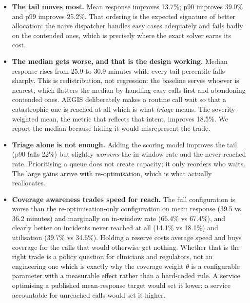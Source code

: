 \begin{itemize}
\item \textbf{The tail moves most.} Mean response improves 13.7\%; p90 improves
      39.0\% and p99 improves 25.2\%. That ordering is the expected signature
      of better allocation: the naive dispatcher handles easy cases adequately
      and fails badly on the contended ones, which is precisely where the exact
      solver earns its cost.

\item \textbf{The median gets worse, and that is the design working.} Median
      response rises from 25.9 to 30.9 minutes while every tail percentile
      falls sharply. This is redistribution, not regression: the baseline
      serves whoever is nearest, which flatters the median by handling easy
      calls first and abandoning contended ones. AEGIS deliberately makes a
      routine call wait so that a catastrophic one is reached at all
      \textemdash{} which is what \emph{triage} means. The severity-weighted
      mean, the metric that reflects that intent, improves 18.5\%. We report
      the median because hiding it would misrepresent the trade.

\item \textbf{Triage alone is not enough.} Adding the scoring model improves
      the tail (p90 falls 22\%) but slightly \emph{worsens} the in-window rate
      and the never-reached rate. Prioritising a queue does not create
      capacity; it only reorders who waits. The large gains arrive with
      re-optimisation, which is what actually reallocates.

\item \textbf{Coverage awareness trades speed for reach.} The full
      configuration is worse than the re-optimisation-only configuration on
      mean response (39.5 vs 36.2 minutes) and marginally on in-window rate
      (66.4\% vs 67.4\%), and clearly better on incidents never reached at all
      (14.1\% vs 18.1\%) and utilisation (39.7\% vs 34.6\%). Holding a reserve
      costs average speed and buys coverage for the calls that would otherwise
      get nothing. Whether that is the right trade is a policy question for
      clinicians and regulators, not an engineering one \textemdash{} which is
      exactly why the coverage weight $\theta$ is a configurable parameter
      with a measurable effect rather than a hard-coded rule. A service
      optimising a published mean-response target would set it lower; a
      service accountable for unreached calls would set it higher.


\end{itemize}
